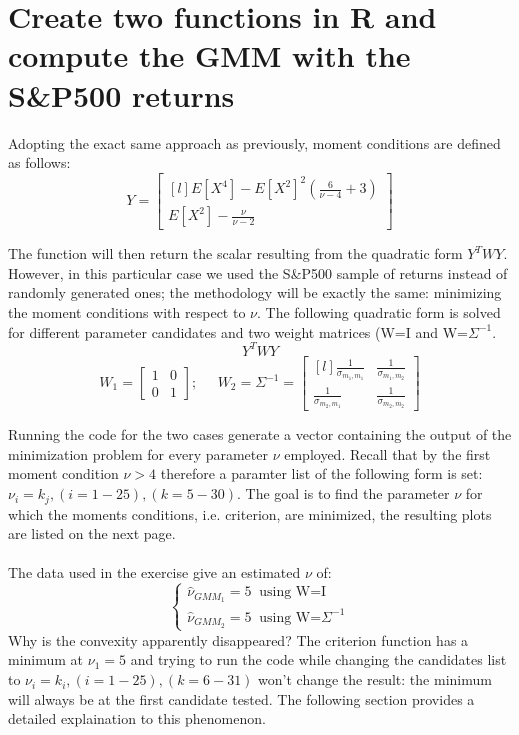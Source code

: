 \newpage
\section{Create two functions in R and compute the GMM with the S\&P500 returns}

Adopting the exact same approach as previously, moment conditions are defined as follows:
\begin{equation*}
    Y=    
    \begin{bmatrix}[l]
    E[X^4]-E[X^2]^2(\frac{6}{\nu-4}+3)  \\
    E[X^2]-\frac{\nu}{\nu-2}
    \end{bmatrix}
\end{equation*}

The function will then return the scalar resulting from the quadratic form $Y^TWY$. However, in this particular case we used the S\&P500 sample of returns instead of randomly generated ones; the methodology will be exactly the same: minimizing the moment conditions with respect to $\nu$. The following quadratic form is solved for different parameter candidates and two weight matrices (W=I and W=$\Sigma^{-1}$.
\begin{equation*}
    Y^TWY
\end{equation*}
\begin{equation*}
    W_1=
    \begin{bmatrix}
        1   &0 \\
        0   &1
    \end{bmatrix};\;\;\;\;\;
    W_2=\Sigma^{-1}=
    \begin{bmatrix}[l]
        \frac{1}{\sigma_{m_1,m_1}}    &\frac{1}{\sigma_{m_1,m_2}} \\
        \frac{1}{\sigma_{m_2,m_1}}    &\frac{1}{\sigma_{m_2,m_2}}
    \end{bmatrix}
\end{equation*}

Running the code for the two cases generate a vector containing the output of the minimization problem for every parameter $\nu$ employed. Recall that by the first moment condition $\nu>4$ therefore a paramter list of the following form is set: $\nu_i=k_j, (i=1-25), (k=5-30)$. The goal is to find the parameter $\nu$ for which the moments conditions, i.e. criterion, are minimized, the resulting plots are listed on the next page.
\\
\\
The data used in the exercise give an estimated $\nu$ of:
\begin{equation*}
    \begin{cases}
    \widehat{\nu}_{GMM_{1}}=5 \;\;\text{using W=I}\\
    \widehat{\nu}_{GMM_{2}}=5 \;\;\text{using W=}\Sigma^{-1}
\end{cases}
\end{equation*}
Why is the convexity apparently disappeared? The criterion function has a minimum at $\nu_1=5$ and trying to run the code while changing the candidates list to $\nu_i=k_i, (i=1-25), (k=6-31)$ won't change the result: the minimum will always be at the first candidate tested. The following section provides a detailed explaination to this phenomenon.

